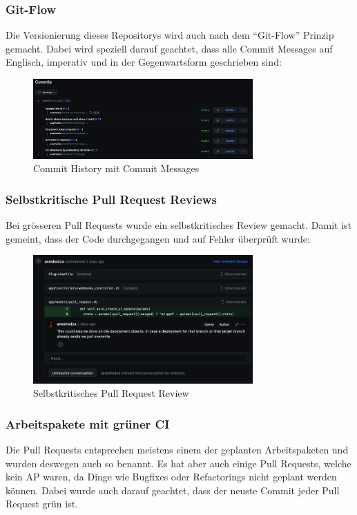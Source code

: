 \subsubsection{Git-Flow}
Die Versionierung dieses Repositorys wird auch nach dem \enquote{Git-Flow} Prinzip gemacht. Dabei wird
speziell darauf geachtet, dass alle Commit Messages auf Englisch, imperativ und in der Gegenwartsform
geschrieben sind: 
\begin{figure}[H]
    \centering    
    \includegraphics[width=0.75\textwidth]{images/misc/git_commit_message.png}
    \caption[Ein Screenshot der Commit History mit den Commit Messages]{Commit History mit Commit Messages}
    \label{fig:git_commit_message}
\end{figure}
\subsubsection{Selbstkritische Pull Request Reviews}
Bei grösseren Pull Requests wurde ein selbstkritisches Review gemacht. Damit ist gemeint, dass der Code durchgegangen
und auf Fehler überprüft wurde:
\begin{figure}[H]
    \centering
    \includegraphics[width=0.75\textwidth]{images/misc/git_pr_review.png}
    \caption[Ein Screenshot eines selbstkritischen Pull Request Reviews]{Selbstkritisches Pull Request Review}
    \label{fig:git_pr_review}
\end{figure}
\subsubsection{Arbeitspakete mit \gls{grün}er CI}
Die Pull Requests entsprechen meistens einem der geplanten Arbeitspaketen und wurden deswegen auch so benannt. Es hat
aber auch einige Pull Requests, welche kein AP waren, da Dinge wie Bugfixes oder Refactorings nicht geplant
werden können. \newline
Dabei wurde auch darauf geachtet, dass der neuste Commit jeder Pull Request grün ist.

